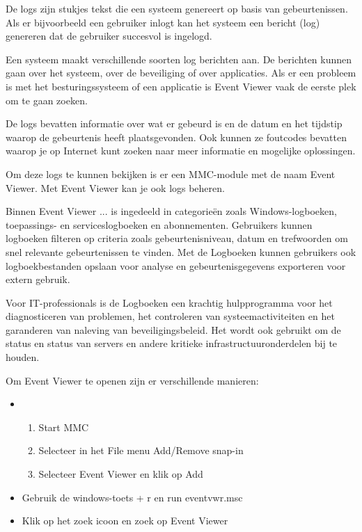De logs zijn stukjes tekst die een systeem genereert op basis van gebeurtenissen. Als er bijvoorbeeld een gebruiker inlogt kan het systeem een bericht (log) genereren dat de gebruiker succesvol is ingelogd.

Een systeem maakt verschillende soorten log berichten aan. De berichten kunnen gaan over het systeem, over de beveiliging of over applicaties. Als er een probleem is met het besturingssysteem of een applicatie is Event Viewer vaak de eerste plek om te gaan zoeken.

De logs bevatten informatie over wat er gebeurd is en de datum en het tijdstip waarop de gebeurtenis heeft plaatsgevonden. Ook kunnen ze foutcodes bevatten waarop je op Internet kunt zoeken naar meer informatie en mogelijke oplossingen.

Om deze logs te kunnen bekijken is er een MMC-module met de naam Event Viewer. Met Event Viewer kan je ook logs beheren.

Binnen Event Viewer ...
is ingedeeld in categorieën zoals Windows-logboeken, toepassings- en serviceslogboeken en abonnementen. Gebruikers kunnen logboeken filteren op criteria zoals gebeurtenisniveau, datum en trefwoorden om snel relevante gebeurtenissen te vinden. Met de Logboeken kunnen gebruikers ook logboekbestanden opslaan voor analyse en gebeurtenisgegevens exporteren voor extern gebruik.

Voor IT-professionals is de Logboeken een krachtig hulpprogramma voor het diagnosticeren van problemen, het controleren van systeemactiviteiten en het garanderen van naleving van beveiligingsbeleid. Het wordt ook gebruikt om de status en status van servers en andere kritieke infrastructuuronderdelen bij te houden.






Om Event Viewer te openen zijn er verschillende manieren:
\begin{itemize}
\item
	\begin{enumerate}
		\item Start MMC
		\item Selecteer in het File menu Add/Remove snap-in
		\item Selecteer Event Viewer en klik op Add
	\end{enumerate}
\item Gebruik de windows-toets + r en run eventvwr.msc
\item Klik op het zoek icoon en zoek op Event Viewer
\end{itemize}

\begin{minipage}[t]{\linewidth}
\raggedright
{}
\end{minipage}


